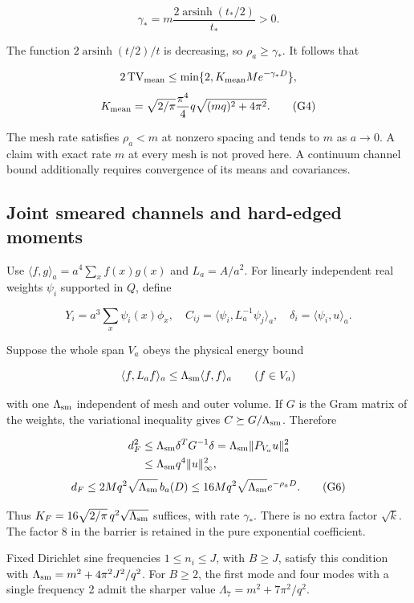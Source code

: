 \documentclass[
  11pt,
  letterpaper,
]{article}
\begin{document}
\[
\gamma_* =m\frac{2\operatorname{arsinh}(t_*/2)}{t_*}>0.
\]

The function \(2\operatorname{arsinh}(t/2)/t\) is decreasing, so
\(\rho_a\ge\gamma_*\). It follows that

\[
2\operatorname{TV}_{\rm mean}\le
\min\{2,K_{\rm mean}M e^{-\gamma_*D}\},
\] \[
K_{\rm mean}=\sqrt{2/\pi}\frac{\pi^4}{4}
q\sqrt{(mq)^2+4\pi^2}.
\tag{G4}
\]

The mesh rate satisfies \(\rho_a<m\) at nonzero spacing and tends to
\(m\) as \(a\to0\). A claim with exact rate \(m\) at every mesh is not
proved here. A continuum channel bound additionally requires convergence
of its means and covariances.

\subsection{Joint smeared channels and hard-edged
moments}\label{joint-smeared-channels-and-hard-edged-moments}

Use \(\langle f,g\rangle_a=a^4\sum_xf(x)g(x)\) and \(L_a=A/a^2\). For
linearly independent real weights \(\psi_i\) supported in \(Q\), define

\[
Y_i=a^3\sum_x\psi_i(x)\phi_x,\quad
C_{ij}=\langle\psi_i,L_a^{-1}\psi_j\rangle_a,\quad
\delta_i=\langle\psi_i,u\rangle_a.
\]

Suppose the whole span \(V_a\) obeys the physical energy bound

\[
\langle f,L_af\rangle_a\le\Lambda_{\rm sm}\langle f,f\rangle_a
\qquad(f\in V_a)
\]

with one \(\Lambda_{\rm sm}\) independent of mesh and outer volume. If
\(G\) is the Gram matrix of the weights, the variational inequality
gives \(C\succeq G/\Lambda_{\rm sm}\). Therefore

\[
\begin{aligned}
d_F^2&\le\Lambda_{\rm sm}\delta^TG^{-1}\delta
=\Lambda_{\rm sm}\|P_{V_a}u\|_a^2\\
&\le\Lambda_{\rm sm}q^4\|u\|_\infty^2,
\end{aligned}
\] \[
d_F\le2Mq^2\sqrt{\Lambda_{\rm sm}}\,b_a(D)
\le16Mq^2\sqrt{\Lambda_{\rm sm}}e^{-\rho_aD}.
\tag{G6}
\]

Thus \(K_F=16\sqrt{2/\pi}\,q^2\sqrt{\Lambda_{\rm sm}}\) suffices, with
rate \(\gamma_*\). There is no extra factor \(\sqrt{k}\). The factor 8
in the barrier is retained in the pure exponential coefficient.

Fixed Dirichlet sine frequencies \(1\le n_i\le J\), with \(B\ge J\),
satisfy this condition with \(\Lambda_{\rm sm}=m^2+4\pi^2J^2/q^2\). For
\(B\ge2\), the first mode and four modes with a single frequency 2 admit
the sharper value \(\Lambda_7=m^2+7\pi^2/q^2\).
\end{document}
